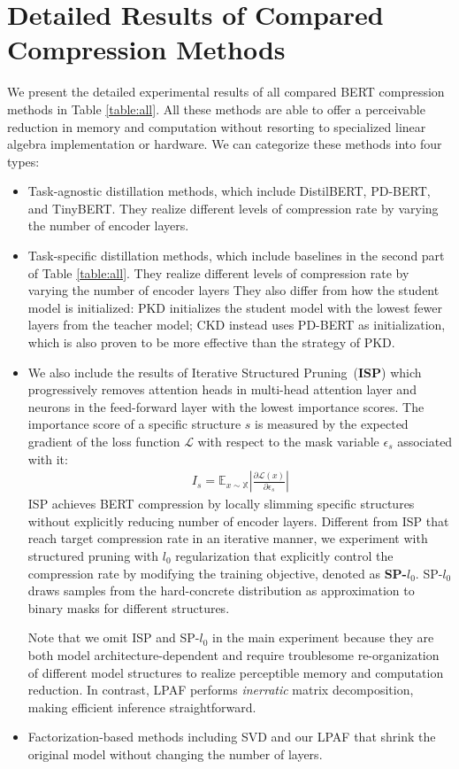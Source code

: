\documentclass[letterpaper]{article} %
\newcommand{\tabref}[1]{Table \ref{#1}}
\begin{document}
	
	\section{Detailed Results of Compared Compression Methods}
	\label{sec:appendixC}
	
	
	We present the detailed experimental results of all compared BERT compression methods in \tabref{table:all}. All these methods are able to offer a perceivable reduction in memory and computation without resorting to specialized linear algebra implementation or hardware. We can categorize these methods into four types: 
	\begin{itemize}
		\item Task-agnostic distillation methods, which include DistilBERT, PD-BERT, and TinyBERT. They realize different levels of compression rate by varying the number of encoder layers.
		\item Task-specific distillation methods, which include baselines in the second part of \tabref{table:all}. They realize different levels of compression rate by varying the number of encoder layers They also differ from how the student model is initialized: PKD initializes the student model with the lowest fewer layers from the teacher model; CKD instead uses PD-BERT as initialization, which is also proven to be more effective  than the strategy of PKD.
		\item We also include the results of  Iterative Structured Pruning~(\textbf{ISP}) which progressively removes attention heads in multi-head attention layer and neurons in the feed-forward layer with the lowest importance scores. The importance score of a specific structure $s$ is measured by the expected gradient of the loss function $\mathcal{L}$ with respect to the mask variable $\epsilon_s$ associated with it:
		\begin{align}
			I_s = \mathbb{E}_{x\sim \mathbb{X}}|\frac{\partial \mathcal{L}(x)}{\partial \epsilon_s}|
		\end{align}
		ISP achieves BERT compression by locally slimming specific structures without explicitly reducing number of encoder layers. Different from ISP that reach target compression rate in an iterative manner, we experiment with structured pruning with $l_0$ regularization that explicitly control the compression rate by modifying the  training objective, denoted as \textbf{SP-$l_0$}. SP-$l_0$ draws samples from the hard-concrete distribution as approximation to binary masks for different structures.
		
		Note that we omit ISP and SP-$l_0$ in the main experiment because they are both model architecture-dependent and require troublesome re-organization of different model structures to realize perceptible memory and computation reduction. In contrast, LPAF performs \textit{inerratic} matrix decomposition, making efficient inference straightforward.
				\item Factorization-based methods including SVD and our LPAF that shrink the original model without changing the number of layers.
	\end{itemize}
	
\end{document}
